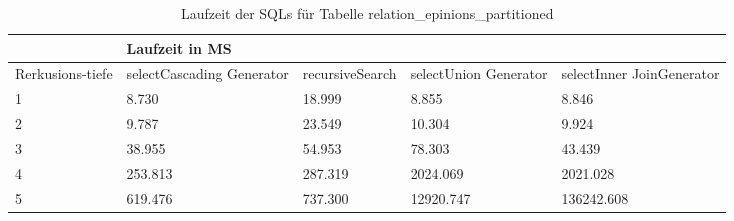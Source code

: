 \begin{table}[H]
	\centering
	\begin{tabular}{l|l|l|l|l|l|}
		\cline{2-6}
		& \multicolumn{5}{|l|}{Laufzeit in MS}                                                                                                                                                  \\ \hline
		\multicolumn{1}{|l|}{\multirow{2}{2cm}{Rerkusions-tiefe}} & \multicolumn{2}{|l|}{\multirow{2}{3cm}{selectCascading Generator}} & \multirow{2}{2.8cm}{recursiveSearch} & \multirow{2}{2.5cm}{selectUnion Generator} & \multirow{2}{2.5cm}{selectInner JoinGenerator} \\
		\multicolumn{1}{|l|}{}
		& \multicolumn{2}{|l|}{}                                           &                                  &                                     &                                           \\ \hline
		
	\multicolumn{1}{|l|}{1}                                 & \multicolumn{2}{l|}{8.730}                                       & 18.999                                                & 8.855                                                     & 8.846                                                           \\ \hline
	\multicolumn{1}{|l|}{2}                                 & \multicolumn{2}{l|}{9.787}                                       & 23.549                                                & 10.304                                                    & 9.924                                                           \\ \hline
	\multicolumn{1}{|l|}{3}                                 & \multicolumn{2}{l|}{38.955}                                      & 54.953                                                & 78.303                                                    & 43.439                                                          \\ \hline
	\multicolumn{1}{|l|}{4}                                 & \multicolumn{2}{l|}{253.813}                                     & 287.319                                               & 2024.069                                                  & 2021.028                                                        \\ \hline
	\multicolumn{1}{|l|}{5}                                 & \multicolumn{2}{l|}{619.476}                                     & 737.300                                               & 12920.747                                                 & 136242.608                                                      \\ \hline
	
		
		
	\end{tabular}
	\caption{Laufzeit der SQLs für Tabelle relation\_epinions\_partitioned}
\end{table}

